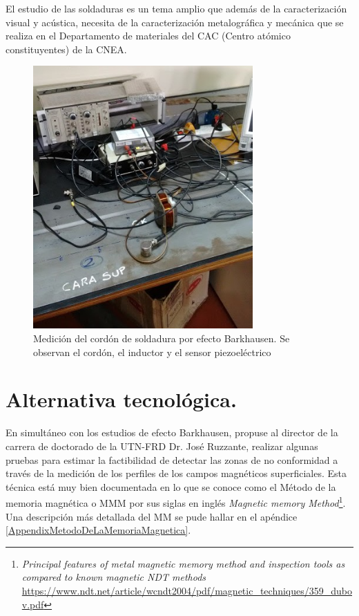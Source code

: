 El estudio de las soldaduras es un tema amplio que además de la caracterización visual y acústica, necesita de la caracterización metalográfica y mecánica que se realiza en el Departamento de materiales del CAC (Centro atómico constituyentes) de la CNEA.

\begin{figure}[htpb]
    \centering
    \includegraphics[width=0.75\textwidth]{./Figures/Barkhausen02}
	\caption{Medición del cordón de soldadura por efecto Barkhausen. Se observan el cordón, el inductor y el sensor piezoeléctrico}
	\label{fig:Barkhausen02}
 \end{figure}

\section{Alternativa tecnológica.}

  En simultáneo con los estudios de efecto Barkhausen, propuse al director de la carrera de doctorado de la UTN-FRD Dr. José Ruzzante, realizar algunas pruebas para estimar la factibilidad de detectar las zonas de no conformidad a través de la medición de los perfiles de los campos magnéticos superficiales. Esta técnica está muy bien documentada en lo que se conoce como el Método de la memoria magnética o MMM por sus siglas en inglés \textit{Magnetic memory Method}\footnote{\textit{Principal features of metal magnetic memory method and inspection tools as compared to known magnetic NDT methods} \url{https://www.ndt.net/article/wcndt2004/pdf/magnetic_techniques/359_dubov.pdf}}\citep{Dubov:1}. Una descripción más detallada del MM se pude hallar en el apéndice \ref{AppendixMetodoDeLaMemoriaMagnetica}. 
  
